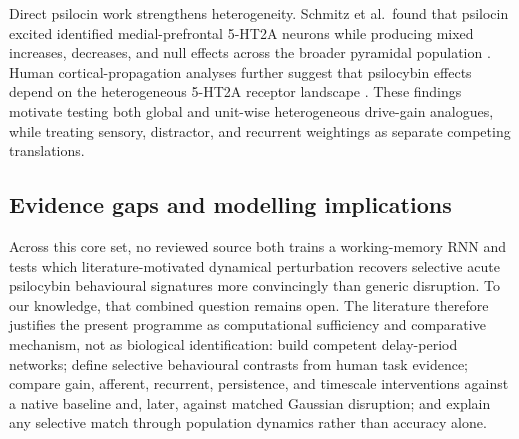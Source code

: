 Direct psilocin work strengthens heterogeneity. Schmitz et al.\ found that
psilocin excited identified medial-prefrontal 5-HT2A neurons while producing
mixed increases, decreases, and null effects across the broader pyramidal
population \cite{schmitz2025}. Human cortical-propagation analyses further
suggest that psilocybin effects depend on the heterogeneous 5-HT2A receptor
landscape \cite{makimarttunen2026}. These findings motivate testing both global
and unit-wise heterogeneous drive-gain analogues, while treating sensory,
distractor, and recurrent weightings as separate competing translations.

\subsection{Evidence gaps and modelling implications}

Across this core set, no reviewed source both trains a working-memory RNN and
tests which literature-motivated dynamical perturbation recovers selective
acute psilocybin behavioural signatures more convincingly than generic
disruption. To our knowledge, that combined question remains open. The
literature therefore justifies the present programme as computational
sufficiency and comparative mechanism, not as biological identification:
build competent delay-period networks; define selective behavioural contrasts
from human task evidence; compare gain, afferent, recurrent, persistence, and
timescale interventions against a native baseline and, later, against matched
Gaussian disruption; and explain any selective match through population
dynamics rather than accuracy alone.
